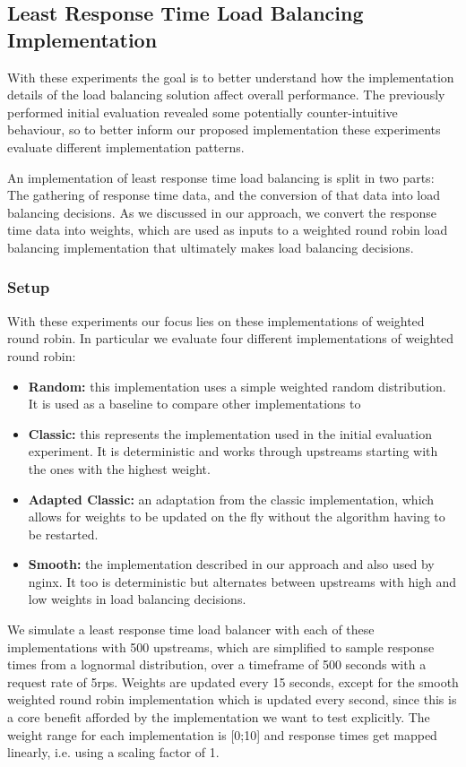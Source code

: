 \subsection{Least Response Time Load Balancing Implementation}
With these experiments the goal is to better understand how the implementation details of the load balancing solution affect overall performance.
The previously performed initial evaluation revealed some potentially counter-intuitive behaviour, so to better inform our proposed implementation these experiments evaluate different implementation patterns.

An implementation of least response time load balancing is split in two parts: The gathering of response time data, and the conversion of that data into load balancing decisions.
As we discussed in our approach, we convert the response time data into weights, which are used as inputs to a weighted round robin load balancing implementation that ultimately makes load balancing decisions.
\subsubsection{Setup}
With these experiments our focus lies on these implementations of weighted round robin.
In particular we evaluate four different implementations of weighted round robin:
\begin{itemize}
    \item \textbf{Random:} this implementation uses a simple weighted random distribution. It is used as a baseline to compare other implementations to
    \item \textbf{Classic:} this represents the implementation used in the initial evaluation experiment\cite{wrr-kblinux}. It is deterministic and works through upstreams starting with the ones with the highest weight.
    \item \textbf{Adapted Classic:} an adaptation from the classic implementation, which allows for weights to be updated on the fly without the algorithm having to be restarted.
    \item \textbf{Smooth:} the implementation described in our approach and also used by nginx\cite{nginx-wrr}. It too is deterministic but alternates between upstreams with high and low weights in load balancing decisions.
\end{itemize}

We simulate a least response time load balancer with each of these implementations with 500 upstreams, which are simplified to sample response times from a lognormal distribution, over a timeframe of 500 seconds with a request rate of 5\gls{rps}.
Weights are updated every 15 seconds, except for the smooth weighted round robin implementation which is updated every second, since this is a core benefit afforded by the implementation we want to test explicitly.
The weight range for each implementation is [0;10] and response times get mapped linearly, i.e. using a scaling factor of 1.

